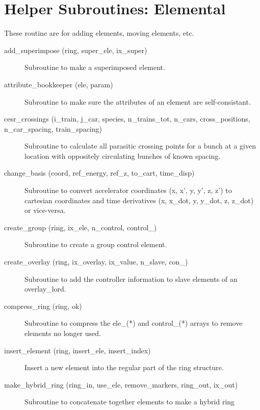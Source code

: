 \section{Helper Subroutines: Elemental}
\label{r:elem}     

These routine are for adding elements, moving elements, etc.

\begin{description}

\item[add\_superimpose (ring, super\_ele, ix\_super)] \Newline
Subroutine to make a superimposed element. 

\item[attribute\_bookkeeper (ele, param)] \Newline
Subroutine to make sure the attributes of an element are self-consistant. 

\item[cesr\_crossings (i\_train, j\_car, species, n\_trains\_tot, n\_cars, cross\_positions, n\_car\_spacing, train\_spacing)] \Newline
Subroutine to calculate all parasitic crossing points for a bunch at a given location with oppositely circulating bunches of known spacing. 

\item[change\_basis (coord, ref\_energy, ref\_z, to\_cart, time\_disp)] \Newline
Subroutine to convert accelerator coordinates (x, x', y, y', z, z') to cartesian coordinates and time derivatives (x, x\_dot, y, y\_dot, z, z\_dot) or vice-versa. 

\item[create\_group (ring, ix\_ele, n\_control, control\_)] \Newline
Subroutine to create a group control element. 

\item[create\_overlay (ring, ix\_overlay, ix\_value, n\_slave, con\_)] \Newline
Subroutine to add the controller information to slave elements of an overlay\_lord. 

\item[compress\_ring (ring, ok)] \Newline
Subroutine to compress the ele\_(*) and control\_(*) arrays to remove elements no longer used. 

\item[insert\_element (ring, insert\_ele, insert\_index)] \Newline
Insert a new element into the regular part of the ring structure. 

\item[make\_hybrid\_ring (ring\_in, use\_ele, remove\_markers, ring\_out, ix\_out)] \Newline
Subroutine to concatenate together elements to make a hybrid ring 


\end{description}
